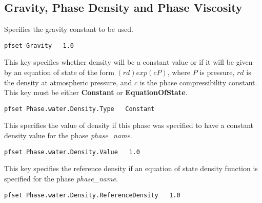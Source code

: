 
\subsection{Gravity, Phase Density and Phase Viscosity}
\label{Gravity, Phase Density and Phase Viscosity}

{Specifies the gravity constant to be used.}
\begin{display}\begin{verbatim}
pfset Gravity	1.0
\end{verbatim}\end{display}

{This key specifies whether density will be a constant value or if
it will be given by an equation of state of the form $(rd)exp(cP)$,
where $P$ is pressure, $rd$ is
the density at atmospheric pressure, and $c$ is the phase
compressibility constant.
This key must be either {\bf Constant} or {\bf EquationOfState}.
}
\begin{display}\begin{verbatim}
pfset Phase.water.Density.Type	 Constant
\end{verbatim}\end{display}

{This specifies the value of density if this phase was specified to have a
constant density value for the phase {\em phase\_name}.}
\begin{display}\begin{verbatim}
pfset Phase.water.Density.Value   1.0
\end{verbatim}\end{display}

{This key specifies the reference density if an equation of state density
function is specified for the phase {\em phase\_name}.}
\begin{display}\begin{verbatim}
pfset Phase.water.Density.ReferenceDensity   1.0
\end{verbatim}\end{display}

